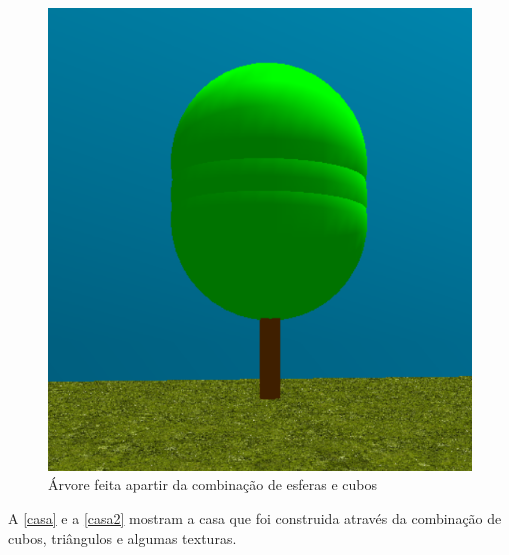 \documentclass[
	12pt,				%
	openright,			%
	a4paper,			%
	english,			%
	french,				%
	spanish,			%
	brazil,				%
	]{abntex2}
\begin{document}
\begin{figure}[H]
\centering 
\caption{Árvore feita apartir da combinação de esferas e cubos} \label{arvorecomesferas}
\includegraphics[scale=0.5]{imagens/arvorecomesferas.png}
\end{figure}

	A \autoref{casa} e a \autoref{casa2} mostram a casa que foi construida através da combinação de cubos, triângulos e algumas texturas.
\end{document}
